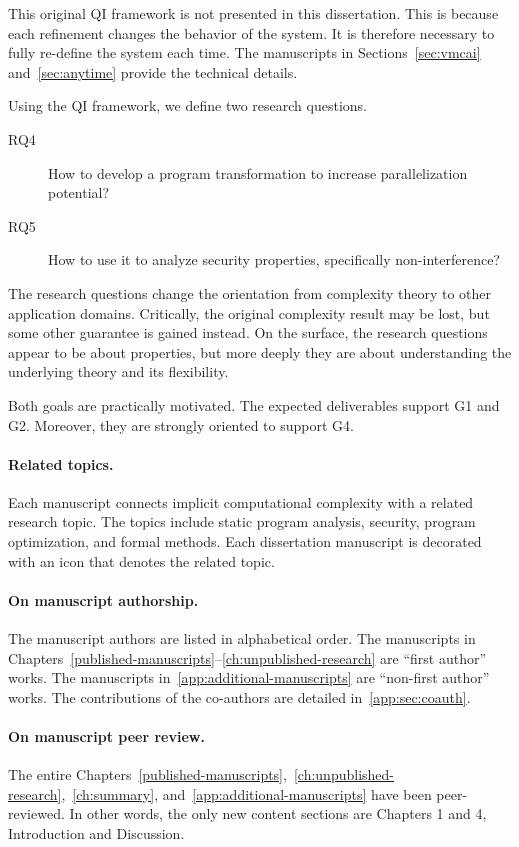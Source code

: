 This original QI framework is not presented in this dissertation.
This is because each refinement changes the behavior of the system.
It is therefore necessary to fully re-define the system each time.
The manuscripts in Sections~\ref{sec:vmcai} and~\ref{sec:anytime} provide the technical details.

Using the QI framework, we define two research questions.
\begin{description}
\item[RQ4] How to develop a program transformation to increase parallelization potential?
\item[RQ5] How to use it to analyze security properties, specifically non-interference?
\end{description}

The research questions change the orientation from complexity theory to other application domains.
Critically, the original complexity result may be lost, but some other guarantee is gained instead.
On the surface, the research questions appear to be about properties, but more deeply they are about understanding the underlying theory and its flexibility.

Both goals are practically motivated. The expected deliverables support G1 and G2. Moreover, they are strongly oriented to support G4.

\paragraph*{Related topics.}
Each manuscript connects implicit computational complexity with a related research topic.
The topics include static program analysis, security, program optimization, and formal methods.
Each dissertation manuscript is decorated with an icon that denotes the related topic.

\paragraph*{On manuscript authorship.}
The manuscript authors are listed in alphabetical order.
The manuscripts in Chapters~\ref{published-manuscripts}--\ref{ch:unpublished-research} are \enquote{first author} works.
The manuscripts in~\autoref{app:additional-manuscripts} are \enquote{non-first author} works.
The contributions of the co-authors are detailed in~\autoref{app:sec:coauth}.

\paragraph*{On manuscript peer review.}
The entire Chapters~\ref{published-manuscripts},~\ref{ch:unpublished-research},~\ref{ch:summary}, and~\ref{app:additional-manuscripts} have been peer-reviewed.
In other words, the only new content sections are Chapters 1 and 4, Introduction and Discussion.

